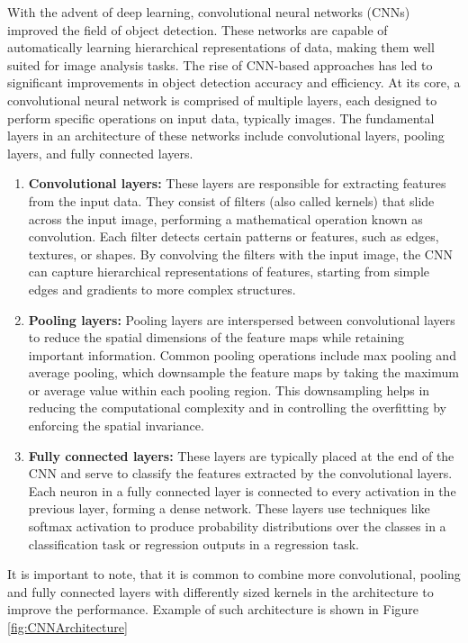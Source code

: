 With the advent of deep learning, convolutional neural networks (CNNs) improved the field of object detection. These
networks are
capable of automatically learning hierarchical representations of data, making them well suited for image analysis
tasks. The rise of CNN-based approaches has led to significant improvements in object detection accuracy and efficiency.
At its core, a convolutional neural network is comprised of multiple layers, each designed to perform specific
operations on input data, typically images. The fundamental layers in an architecture of these networks include convolutional layers,
pooling layers, and fully connected layers.
\begin{enumerate}
  \item \textbf{Convolutional layers:} These layers are responsible for extracting features from the input data. They consist of filters (also called kernels) that slide across the input image, performing a mathematical operation known as convolution. Each filter detects certain patterns or features, such as edges, textures, or shapes. By convolving the filters with the input image, the CNN can capture hierarchical representations of features, starting from simple edges and gradients to more complex structures.
  \item \textbf{Pooling layers:} Pooling layers are interspersed between convolutional layers to reduce the spatial dimensions of the feature maps while retaining important information. Common pooling operations include max pooling and average pooling, which downsample the feature maps by taking the maximum or average value within each pooling region. This downsampling helps in reducing the computational complexity and in controlling the overfitting by enforcing the spatial invariance.
  \item \textbf{Fully connected layers:} These layers are typically placed at the end of the CNN and serve to classify the features extracted by the convolutional layers. Each neuron in a fully connected layer is connected to every activation in the previous layer, forming a dense network. These layers use techniques like softmax activation to produce probability distributions over the classes in a classification task or regression outputs in a regression task.
\end{enumerate}
It is important to note, that it is common to combine more convolutional, pooling and fully connected layers with differently sized kernels in the architecture to improve the performance. Example of such architecture is shown in Figure \ref{fig:CNNArchitecture}

